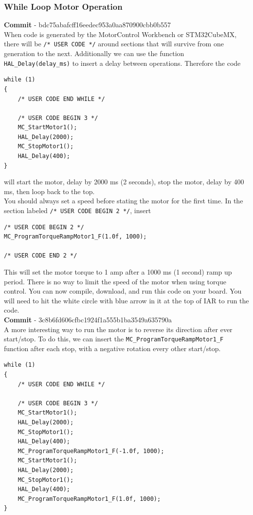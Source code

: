 \documentclass[10pt]{article}
\begin{document}
			\FloatBarrier \subsubsection{While Loop Motor Operation}
                \textbf{Commit} - bdc75abafcff16eedec953a0aa870900cbb0b557 \\
                When code is generated by the MotorControl Workbench or STM32CubeMX, there will be \texttt{/* USER CODE */} around sections that will survive from one generation to the next. Additionally we can use the function \texttt{HAL\_Delay(delay\_ms)} to insert a delay between operations. Therefore the code 
                \begin{verbatim}
while (1)
{
    /* USER CODE END WHILE */

    /* USER CODE BEGIN 3 */
    MC_StartMotor1();
    HAL_Delay(2000);
    MC_StopMotor1();
    HAL_Delay(400);
}
                \end{verbatim}
                will start the motor, delay by 2000 ms (2 seconds), stop the motor, delay by 400 ms, then loop back to the top. \\ 
                You should always set a speed before stating the motor for the first time. In the section labeled \texttt{/* USER CODE BEGIN 2 */}, insert
                \begin{verbatim}
/* USER CODE BEGIN 2 */
MC_ProgramTorqueRampMotor1_F(1.0f, 1000);

/* USER CODE END 2 */
                \end{verbatim}
                This will set the motor torque to 1 amp after a 1000 ms (1 second) ramp up period. There is no way to limit the speed of the motor when using torque control. You can now compile, download, and run this code on your board. You will need to hit the white circle with blue arrow in it at the top of IAR to run the code. \\
                \textbf{Commit} - 3c8b6fd606cfbc1924f1a555b1ba3549a635790a \\
                A more interesting way to run the motor is to reverse its direction after ever start/stop. To do this, we can insert the \texttt{MC\_ProgramTorqueRampMotor1\_F} function after each stop, with a negative rotation every other start/stop.
                \begin{verbatim}
while (1)
{
    /* USER CODE END WHILE */

    /* USER CODE BEGIN 3 */
    MC_StartMotor1();
    HAL_Delay(2000);
    MC_StopMotor1();
    HAL_Delay(400);
    MC_ProgramTorqueRampMotor1_F(-1.0f, 1000);
    MC_StartMotor1();
    HAL_Delay(2000);
    MC_StopMotor1();
    HAL_Delay(400);
    MC_ProgramTorqueRampMotor1_F(1.0f, 1000);
}
                \end{verbatim}
\end{document}
